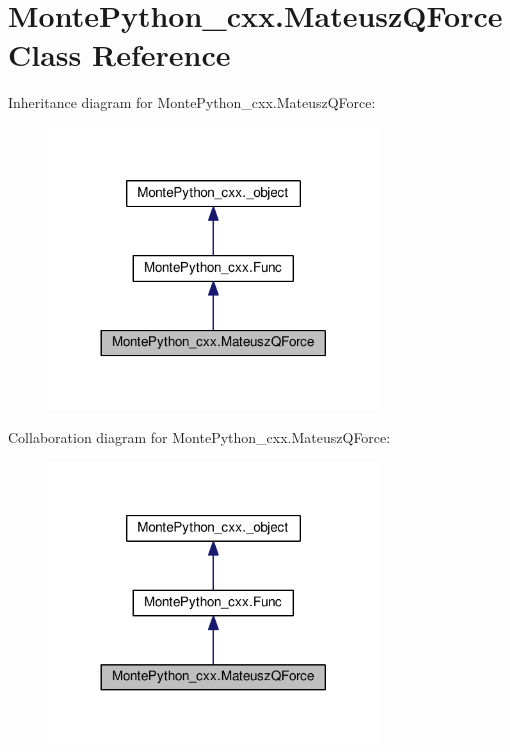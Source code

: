 \hypertarget{classMontePython__cxx_1_1MateuszQForce}{}\section{Monte\+Python\+\_\+cxx.\+Mateusz\+Q\+Force Class Reference}
\label{classMontePython__cxx_1_1MateuszQForce}


Inheritance diagram for Monte\+Python\+\_\+cxx.\+Mateusz\+Q\+Force\+:
\nopagebreak
\begin{figure}[H]
\begin{center}
\leavevmode
\includegraphics[width=248pt]{classMontePython__cxx_1_1MateuszQForce__inherit__graph}
\end{center}
\end{figure}


Collaboration diagram for Monte\+Python\+\_\+cxx.\+Mateusz\+Q\+Force\+:
\nopagebreak
\begin{figure}[H]
\begin{center}
\leavevmode
\includegraphics[width=248pt]{classMontePython__cxx_1_1MateuszQForce__coll__graph}
\end{center}
\end{figure}
